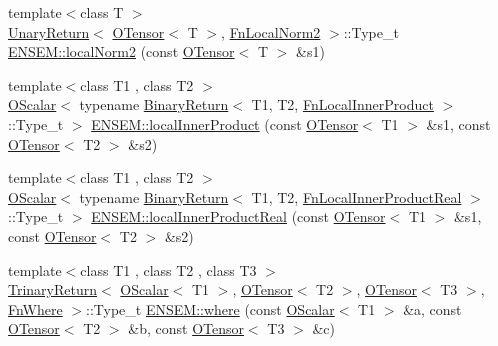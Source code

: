 \begin{DoxyCompactItemize}
\item 
{\footnotesize template$<$class T $>$ }\\\mbox{\hyperlink{structENSEM_1_1UnaryReturn}{Unary\+Return}}$<$ \mbox{\hyperlink{classENSEM_1_1OTensor}{O\+Tensor}}$<$ T $>$, \mbox{\hyperlink{structENSEM_1_1FnLocalNorm2}{Fn\+Local\+Norm2}} $>$\+::Type\+\_\+t \mbox{\hyperlink{group__obstensor_ga4d3ab927a59e8e7e944243bad78ea1fd}{E\+N\+S\+E\+M\+::local\+Norm2}} (const \mbox{\hyperlink{classENSEM_1_1OTensor}{O\+Tensor}}$<$ T $>$ \&s1)
\item 
{\footnotesize template$<$class T1 , class T2 $>$ }\\\mbox{\hyperlink{classENSEM_1_1OScalar}{O\+Scalar}}$<$ typename \mbox{\hyperlink{structENSEM_1_1BinaryReturn}{Binary\+Return}}$<$ T1, T2, \mbox{\hyperlink{structENSEM_1_1FnLocalInnerProduct}{Fn\+Local\+Inner\+Product}} $>$\+::Type\+\_\+t $>$ \mbox{\hyperlink{group__obstensor_gaffb6c3d07f9c4ba10a5712ce49725d68}{E\+N\+S\+E\+M\+::local\+Inner\+Product}} (const \mbox{\hyperlink{classENSEM_1_1OTensor}{O\+Tensor}}$<$ T1 $>$ \&s1, const \mbox{\hyperlink{classENSEM_1_1OTensor}{O\+Tensor}}$<$ T2 $>$ \&s2)
\item 
{\footnotesize template$<$class T1 , class T2 $>$ }\\\mbox{\hyperlink{classENSEM_1_1OScalar}{O\+Scalar}}$<$ typename \mbox{\hyperlink{structENSEM_1_1BinaryReturn}{Binary\+Return}}$<$ T1, T2, \mbox{\hyperlink{structENSEM_1_1FnLocalInnerProductReal}{Fn\+Local\+Inner\+Product\+Real}} $>$\+::Type\+\_\+t $>$ \mbox{\hyperlink{group__obstensor_ga39e2368c90f850b08cd366076195fbc4}{E\+N\+S\+E\+M\+::local\+Inner\+Product\+Real}} (const \mbox{\hyperlink{classENSEM_1_1OTensor}{O\+Tensor}}$<$ T1 $>$ \&s1, const \mbox{\hyperlink{classENSEM_1_1OTensor}{O\+Tensor}}$<$ T2 $>$ \&s2)
\item 
{\footnotesize template$<$class T1 , class T2 , class T3 $>$ }\\\mbox{\hyperlink{structENSEM_1_1TrinaryReturn}{Trinary\+Return}}$<$ \mbox{\hyperlink{classENSEM_1_1OScalar}{O\+Scalar}}$<$ T1 $>$, \mbox{\hyperlink{classENSEM_1_1OTensor}{O\+Tensor}}$<$ T2 $>$, \mbox{\hyperlink{classENSEM_1_1OTensor}{O\+Tensor}}$<$ T3 $>$, \mbox{\hyperlink{structENSEM_1_1FnWhere}{Fn\+Where}} $>$\+::Type\+\_\+t \mbox{\hyperlink{group__obstensor_ga11064bec720719323becc2499a52e251}{E\+N\+S\+E\+M\+::where}} (const \mbox{\hyperlink{classENSEM_1_1OScalar}{O\+Scalar}}$<$ T1 $>$ \&a, const \mbox{\hyperlink{classENSEM_1_1OTensor}{O\+Tensor}}$<$ T2 $>$ \&b, const \mbox{\hyperlink{classENSEM_1_1OTensor}{O\+Tensor}}$<$ T3 $>$ \&c)
\end{DoxyCompactItemize}


